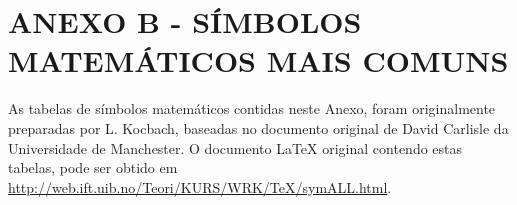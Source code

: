 \renewcommand{\thechapter}{}%
\chapter{ANEXO B - SÍMBOLOS MATEMÁTICOS MAIS COMUNS} %
\label{anexoB} %
\renewcommand{\thechapter}{B}%

As tabelas de símbolos matemáticos contidas neste Anexo, foram originalmente preparadas por L. Kocbach, baseadas no documento original de David Carlisle da Universidade de Manchester. O documento \LaTeX{} original contendo estas tabelas, pode ser obtido em \url{http://web.ift.uib.no/Teori/KURS/WRK/TeX/symALL.html}.


\def\W#1#2{$#1{#2}$ &\tt\string#1\string{#2\string}}
\def\X#1{$#1$ &\tt\string#1}
\def\Y#1{$\big#1$ &\tt\string#1}
\def\Z#1{\tt\string#1}



